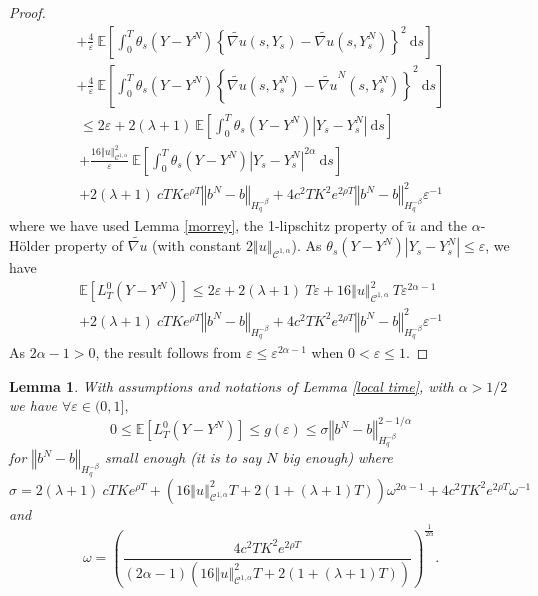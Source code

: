 \documentclass[12pt]{article}
\newtheorem{lem}[theo]{Lemma}
\newcommand{\norme}[1]{\left\Vert #1\right\Vert}
\newcommand{\E}{\mathbb{E}}
\newcommand{\di}{\mathrm{d}}
\begin{document}
\begin{proof}
\begin{multline*}
    +\frac{4}{\varepsilon}\ \E\left[\int_0^T \theta_s(Y-Y^N)\left\{\widetilde{\nabla u}\left(s,Y_s\right)-\widetilde{\nabla u}\left(s,Y_s^N\right)\right\}^2\ \di s\right]\\
    +\frac{4}{\varepsilon}\ \E\left[\int_0^T \theta_s(Y-Y^N)\left\{\widetilde{\nabla u}\left(s,Y_s^N\right)-\widetilde{\nabla u}^N\left(s,Y_s^N\right)\right\}^2\ \di s\right]
    \end{multline*}
    \begin{multline*}
    \leq 2\varepsilon + 2(\lambda + 1)\ \E\left[\int_0^T\theta_s(Y-Y^N)\left|Y_s - Y^N_s\right|\ \di s \right] \\
    +\frac{16\norme{u}_{\mathcal{C}^{1,\alpha}}^2}{\varepsilon}\ \E\left[\int_0^T \theta_s(Y-Y^N)\left|Y_s - Y^N_s\right|^{2\alpha}\ \di s\right]\\
    +2(\lambda + 1)\ cT Ke^{\rho T}\norme{b^N-b}_{H^{-\beta}_{q}} +4c^2T K^2e^{2\rho T}\norme{b^N-b}_{H^{-\beta}_{q}}^2\varepsilon^{-1}
    \end{multline*}
    where we have used Lemma \ref{morrey}, the 1-lipschitz property of $\tilde{u}$ and the $\alpha$-Hölder property of $\widetilde{\nabla u}$ (with constant $2\norme{u}_{\mathcal{C}^{1,\alpha}}$). As $\theta_s(Y-Y^N)\left|Y_s - Y^N_s\right|\leq \varepsilon$, we have    
    \begin{multline*}
    \E\left[L^0_T(Y-Y^N)\right]\leq 2\varepsilon + 2(\lambda + 1)\ T\varepsilon
    +16\norme{u}_{\mathcal{C}^{1,\alpha}}^2\ T \varepsilon^{2\alpha-1}\\
    +2(\lambda + 1)\ cT Ke^{\rho T}\norme{b^N-b}_{H^{-\beta}_{q}} +4c^2T K^2e^{2\rho T}\norme{b^N-b}_{H^{-\beta}_{q}}^2\varepsilon^{-1}
    \end{multline*}    
    As $2\alpha-1>0$, the result follows from $\varepsilon\leq\varepsilon^{2\alpha-1}$ when $0<\varepsilon\leq1$.  
    
\end{proof}

\begin{lem}\label{key lemma}
    With assumptions and notations of Lemma \ref{local time}, with $\alpha>1/2$ we have $\forall \varepsilon\in(0,1],$
    \begin{equation}
    0\leq\E\left[L^0_T(Y-Y^N)\right]\leq g(\varepsilon) \leq \sigma\norme{b^N-b}_{H^{-\beta}_{q}}^{2-1/\alpha}
    \end{equation}
    for $\norme{b^N-b}_{H^{-\beta}_{q}}$ small enough (it is to say $N$ big enough) where \begin{equation*}
    \sigma = 2(\lambda + 1)\ cT Ke^{\rho T} + \left(16\norme{u}_{\mathcal{C}^{1,\alpha}}^2 T + 2(1+(\lambda + 1)T)\right) \omega^{2\alpha-1} + 4c^2T K^2e^{2\rho T}\omega^{-1}
    \end{equation*} and \begin{equation*}
    \omega = \left(\frac{4c^2T K^2e^{2\rho T}}{(2\alpha-1)\left(16\norme{u}_{\mathcal{C}^{1,\alpha}}^2 T + 2(1+(\lambda + 1)T)\right)}\right)^{\frac{1}{2\alpha}}.
    \end{equation*}
\end{lem}
\end{document}
